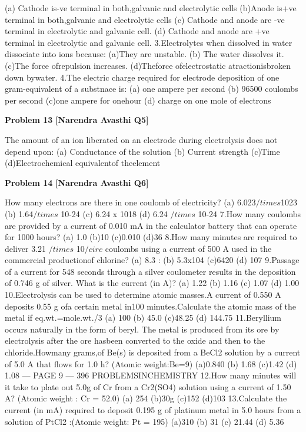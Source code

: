 \begin{problembox}
(a) Cathode is-ve terminal in both,galvanic and electrolytic cells
(b)Anode is+ve terminal in both,galvanic and electrolytic cells
(c) Cathode and anode are -ve terminal in electrolytic and galvanic cell.
(d) Cathode and anode are +ve terminal in electrolytic and galvanic cell.
3.Electrolytes when dissolved in water dissociate into ions because:
(a)They are unstable.
(b) The water dissolves it.
(c)The force ofrepulsion increases.
(d)Theforce ofelectrostatic atractionisbroken down bywater.
4.The electric charge required for electrode deposition of one gram-equivalent of a substnace is:
(a) one ampere per second
(b) 96500 coulombs per second
(c)one ampere for onehour
(d) charge on one mole of electrons
\end{problembox}

\begin{problembox}
\textbf{Problem 13} \hfill \textbf{[Narendra Avasthi Q5]}
\label{q:ext-narendra_avasthi_all_questions-13}

The amount of an ion liberated on an electrode during electrolysis does not depend upon:
(a) Conductance of the solution
(b) Current strength
(c)Time
(d)Electrochemical equivalentof theelement
\end{problembox}

\begin{problembox}
\textbf{Problem 14} \hfill \textbf{[Narendra Avasthi Q6]}
\label{q:ext-narendra_avasthi_all_questions-14}

How many electrons are there in one coulomb of electricity?
(a) 6.023$/times$1023
(b) 1.64$/times$ 10-24
(c) 6.24 x 1018
(d) 6.24 $/times$ 10-24
7.How many coulombs are provided by a current of 0.010 mA in the calculator battery that can
operate for 1000 hours?
(a) 1.0
(b)10
(c)0.010
(d)36
8.How many minutes are required to deliver 3.21 $/times$ 10$/circ$ coulombs using a current of 500 A used
in the commercial productionof chlorine?
(a) 8.3
: (b) 5.3x104
(c)6420
(d) 107
9.Passage of a current for 548 seconds through a silver coulometer results in the deposition of
0.746 g of silver. What is the current (in A)?
(a) 1.22
(b) 1.16
(c) 1.07
(d) 1.00
10.Electrolysis can be used to determine atomic masses.A current of 0.550 A deposits 0.55 g ofa
certain metal in100 minutes.Calculate the atomic mass of the metal if eq.wt.=mole.wt./3
(a) 100
(b) 45.0
(c)48.25
(d) 144.75
11.Beryllium occurs naturally in the form of beryl. The metal is produced from its ore by
electrolysis after the ore hasbeen converted to the oxide and then to the chloride.Howmany
grams,of Be(s) is deposited from a BeCl2 solution by a current of 5.0 A that flows for 1.0 h?
(Atomic weight:Be=9)
(a)0.840
(b) 1.68
(c)1.42
(d) 1.08
--- PAGE 9 ---
396
PROBLEMSINCHEMISTRY
12.How many minutes will it take to plate out 5.0g of Cr from a Cr2(SO4) solution using a
current of 1.50 A? (Atomic weight : Cr = 52.0)
(a) 254
(b)30g
(c)152
(d)103
13.Calculate the current (in mA) required to deposit 0.195 g of platinum metal in 5.0 hours from
a solution of PtCl2 :(Atomic weight: Pt = 195)
(a)310
(b) 31
(c) 21.44
(d) 5.36
\end{problembox}

